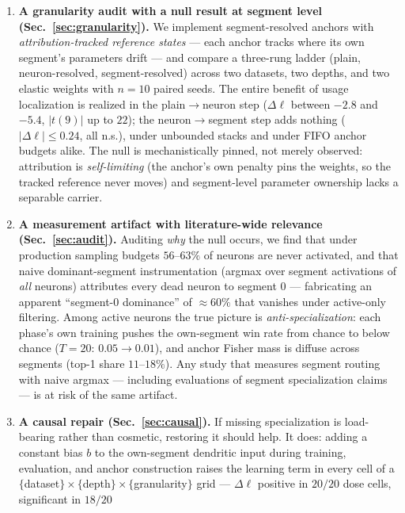 \documentclass[review,12pt,number]{elsarticle}
\begin{document}
\begin{enumerate}
\item \textbf{A granularity audit with a null result at segment level
      (Sec.~\ref{sec:granularity}).} We implement segment-resolved anchors
      with \emph{attribution-tracked reference states} --- each anchor tracks
      where its own segment's parameters drift --- and compare a three-rung
      ladder (plain, neuron-resolved, segment-resolved) across two datasets,
      two depths, and two elastic weights with $n{=}10$ paired seeds. The
      entire benefit of usage localization is realized in the
      plain$\to$neuron step ($\Delta\ell$ between $-2.8$ and $-5.4$,
      $|t(9)|$ up to $22$); the neuron$\to$segment step adds nothing
      ($|\Delta\ell|\le 0.24$, all n.s.), under unbounded stacks and under
      FIFO anchor budgets alike. The null is mechanistically pinned, not
      merely observed: attribution is \emph{self-limiting} (the anchor's own
      penalty pins the weights, so the tracked reference never moves) and
      segment-level parameter ownership lacks a separable carrier.
\item \textbf{A measurement artifact with literature-wide relevance
      (Sec.~\ref{sec:audit}).} Auditing \emph{why} the null occurs, we find
      that under production sampling budgets $56$--$63\%$ of neurons are
      never activated, and that naive dominant-segment instrumentation
      (argmax over segment activations of \emph{all} neurons) attributes
      every dead neuron to segment 0 --- fabricating an apparent
      ``segment-0 dominance'' of $\approx 60\%$ that vanishes under
      active-only filtering. Among active neurons the true picture is
      \emph{anti-specialization}: each phase's own training pushes the
      own-segment win rate from chance to below chance
      ($T{=}20$: $0.05 \to 0.01$), and anchor Fisher mass is diffuse across
      segments (top-1 share $11$--$18\%$). Any study that measures segment
      routing with naive argmax --- including evaluations of segment
      specialization claims --- is at risk of the same artifact.
\item \textbf{A causal repair (Sec.~\ref{sec:causal}).} If missing
      specialization is load-bearing rather than cosmetic, restoring it
      should help. It does: adding a constant bias $b$ to the own-segment
      dendritic input during training, evaluation, and anchor
      construction raises the learning term in every cell of a
      $\{$dataset$\}\times\{$depth$\}\times\{$granularity$\}$ grid ---
      $\Delta\ell$ positive in $20/20$ dose cells, significant in $18/20$

\end{enumerate}
\end{document}
